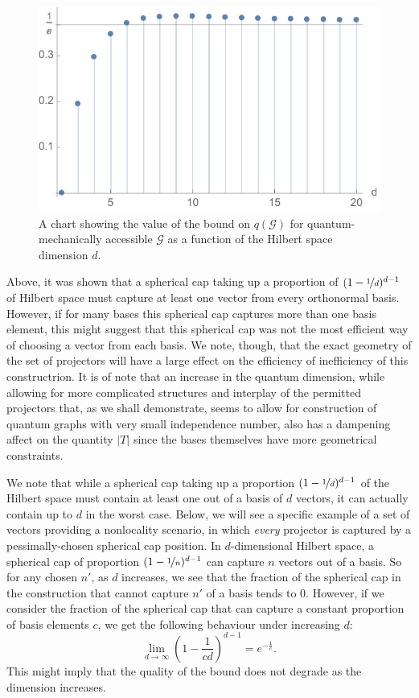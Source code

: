\documentclass{amsart}
\theoremstyle{definition}
\begin{document}
\begin{figure}
\begin{center}
\includegraphics{boundgraph}
\caption{A chart showing the value of the bound on $q(\mathcal{G})$ for quantum-mechanically accessible $\mathcal{G}$ as a function of the Hilbert space dimension $d$.}
\label{boundgraph}
\end{center}
\end{figure}
Above, it was shown that a spherical cap taking up a proportion of $(1-\nicefrac1d)^{d-1}$ of Hilbert space must capture at least one vector from every orthonormal basis. However, if for many bases this spherical cap captures more than one basis element, this might suggest that this spherical cap was not the most efficient way of choosing a vector from each basis. We note, though, that the exact geometry of the set of projectors will have a large effect on the efficiency of inefficiency of this constructrion. It is of note that an increase in the quantum dimension, while allowing for more complicated structures and interplay of the permitted projectors that, as we shall demonstrate, seems to allow for construction of quantum graphs with very small independence number, also has a dampening affect on the quantity $|T|$ since the bases themselves have more geometrical constraints. %

We note that while a spherical cap taking up a proportion $(1-\nicefrac1d)^{d-1}$ of the Hilbert space must contain at least one out of a basis of $d$ vectors, it can actually contain up to $d$ in the worst case. Below, we will see a specific example of a set of vectors providing a nonlocality scenario, in which \emph{every} projector is captured by a pessimally-chosen spherical cap position. In $d$-dimensional Hilbert space, a spherical cap of proportion $(1-\nicefrac1n)^{d-1}$ can capture $n$ vectors out of a basis. So for any chosen $n'$, as $d$ increases, we see that the fraction of the spherical cap in the construction that cannot capture $n'$ of a basis tends to 0. However, if we consider the fraction of the spherical cap that can capture a constant proportion of basis elements $c$, we get the following behaviour under increasing $d$: %
\begin{equation}
\lim_{d\rightarrow\infty} \left(1-\frac{1}{cd}\right)^{d-1}=e^{-\frac1c}.
\end{equation}
This might imply that the quality of the bound does not degrade as the dimension increases.%
\end{document}

